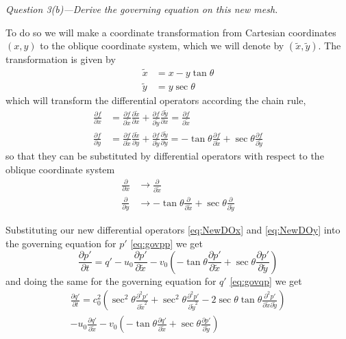 \documentclass[11pt]{article}
\begin{document}
\begin{tcolorbox}
  \textit{Question 3(b)---Derive the governing equation on this new mesh.}
\end{tcolorbox}
To do so we will make a coordinate transformation from Cartesian coordinates $(x,y)$ to the oblique coordinate system, which we will denote by $(\tilde{x}, \tilde{y})$. The transformation is given by
\begin{subequations}
\begin{align}
  \tilde{x} &= x - y\tan\theta \\
  \tilde{y} &= y\sec\theta
\end{align}
\end{subequations}
which will transform the differential operators according the chain rule,
\begin{align*}
  \frac{\partial f}{\partial x} &= \frac{\partial f}{\partial \tilde{x}} \frac{\partial \tilde{x}}{\partial x}
  + \frac{\partial f}{\partial \tilde{y}} \frac{\partial \tilde{y}}{\partial x} = \frac{\partial f}{\partial \tilde{x}} \\
  \frac{\partial f}{\partial y} &= \frac{\partial f}{\partial \tilde{x}} \frac{\partial \tilde{x}}{\partial y}
  + \frac{\partial f}{\partial \tilde{y}} \frac{\partial \tilde{y}}{\partial y} = -\tan\theta\frac{\partial f}{\partial \tilde{x}} + \sec\theta \frac{\partial f}{\partial \tilde{y}}
\end{align*}
so that they can be substituted by differential operators with respect to the oblique coordinate system
\begin{subequations}
\begin{align}
  \frac{\partial}{\partial x} &\rightarrow \frac{\partial}{\partial \tilde{x}} \label{eq:NewDOx} \\
  \frac{\partial}{\partial y} &\rightarrow -\tan\theta\frac{\partial}{\partial \tilde{x}} + \sec\theta\frac{\partial}{\partial \tilde{y}} \label{eq:NewDOy}
\end{align}
\end{subequations}

Substituting our new differential operators \eqref{eq:NewDOx} and \eqref{eq:NewDOy} into the governing equation for $p'$ \eqref{eq:govpp} we get
\begin{equation} \label{eq:govppTilde}
\frac{\partial p'}{\partial t} = q' - u_0 \frac{\partial p'}{\partial \tilde{x}} - v_0 \left( -\tan\theta \frac{\partial p'}{\partial \tilde{x}} + \sec\theta  \frac{\partial p'}{\partial \tilde{y}} \right)
\end{equation}
and doing the same for the governing equation for $q'$ \eqref{eq:govqp} we get
\begin{multline} \label{eq:govqpTilde}
\frac{\partial q'}{\partial t} =
  c_0^2 \left( \sec^2\theta \frac{\partial^2 p'}{\partial \tilde{x}^2} + \sec^2\theta \frac{\partial^2 p'}{\partial \tilde{y}^2} - 2\sec\theta\tan\theta \frac{\partial^2 p'}{\partial\tilde{x} \partial\tilde{y}} \right) \\
  - u_0 \frac{\partial q'}{\partial \tilde{x}}
  - v_0 \left( -\tan\theta \frac{\partial q'}{\partial \tilde{x}} + \sec\theta \frac{\partial p'}{\partial \tilde{y}} \right)
\end{multline}
\end{document}
